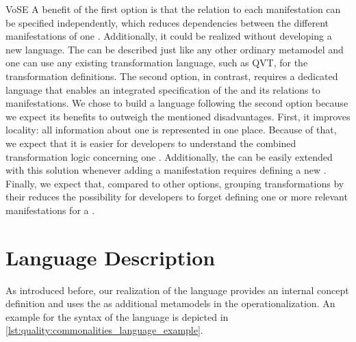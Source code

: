 \begin{copiedFrom}{VoSE}
A benefit of the first option is that the relation to each manifestation can be specified independently, which reduces dependencies between the different manifestations of one \conceptmetamodel.
Additionally, it could be realized without developing a new language. The \conceptmetamodels can be described just like any other ordinary metamodel and one can use any existing transformation language, such as QVT, for the transformation definitions.
The second option, in contrast, requires a dedicated language that enables an integrated specification of the \conceptmetamodel and its relations to manifestations.
We chose to build a language following the second option because we expect its benefits to outweigh the mentioned disadvantages.
First, it improves locality: all information about one \commonality is represented in one place.
Because of that, we expect that it is easier for developers to understand the combined transformation logic concerning one \commonality.
Additionally, the \conceptmetamodel can be easily extended with this solution whenever adding a manifestation requires defining a new \commonality.
Finally, we expect that, compared to other options, grouping transformations by their \commonality reduces the possibility for developers to forget defining one or more relevant manifestations for a \commonality.


\section{Language Description}

As introduced before, our realization of the \commonalities language
provides an internal concept definition and uses the \conceptmetamodels as additional metamodels in the operationalization.
An example for the syntax of the \commonalities language is depicted in \autoref{lst:quality:commonalities_language_example}.


\end{copiedFrom}
